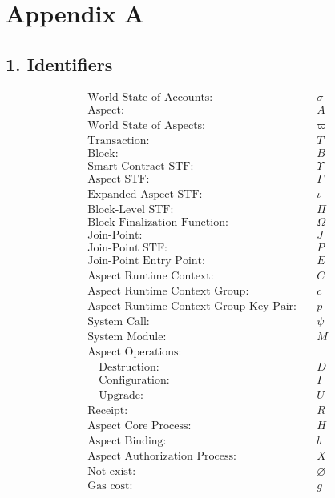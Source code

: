 \section*{Appendix A}

\subsection*{1. Identifiers}
\begin{align*}
\text{World State of Accounts:} & \quad \sigma \\
\text{Aspect:} & \quad A \\
\text{World State of Aspects:} & \quad \varpi \\
\text{Transaction:} & \quad T \\
\text{Block:} & \quad B \\
\text{Smart Contract STF:} & \quad \Upsilon \\
\text{Aspect STF:} & \quad \Gamma \\
    \text{Expanded Aspect STF:} & \quad \iota \\
\text{Block-Level STF:} & \quad \Pi \\
\text{Block Finalization Function:} & \quad \Omega \\
\text{Join-Point:} & \quad J \\
\text{Join-Point STF:} & \quad P \\
\text{Join-Point Entry Point:} & \quad E \\
\text{Aspect Runtime Context:} & \quad C \\
    \text{Aspect Runtime Context Group:} & \quad c \\
    \text{Aspect Runtime Context Group Key Pair:} & \quad p \\
\text{System Call:} & \quad \psi \\
\text{System Module:} & \quad M \\
\text{Aspect Operations:} & \\
    \quad \text{Destruction:} & \quad D \\
    \quad \text{Configuration:} & \quad I \\
    \quad \text{Upgrade:} & \quad U \\
\text{Receipt:} & \quad R \\
\text{Aspect Core Process:} & \quad H \\
\text{Aspect Binding:} & \quad b \\
\text{Aspect Authorization Process:} & \quad X \\
\text{Not exist:} & \quad \varnothing \\
\text{Gas cost:} & \quad g \\
\end{align*}

